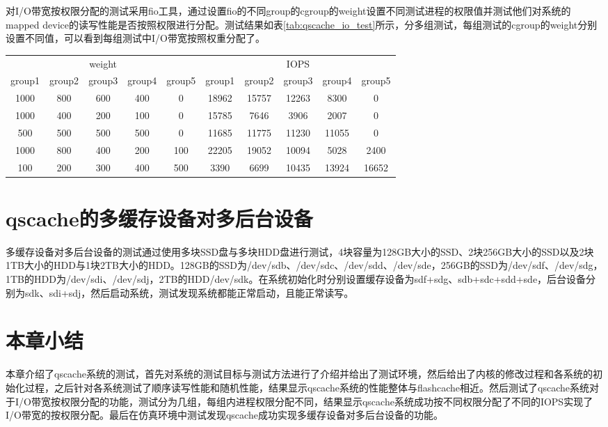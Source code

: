 对I/O带宽按权限分配的测试采用fio工具，通过设置fio的不同group的cgroup的weight设置不同测试进程的权限值并测试他们对系统的mapped device的读写性能是否按照权限进行分配。测试结果如表\ref{tab:qscache_io_test}所示，分多组测试，每组测试的cgroup的weight分别设置不同值，可以看到每组测试中I/O带宽按照权重分配了。

\begin{table}[!hpb]
    \centering
    \begin{tabular}{@{}cccccccccc@{}} 
        \toprule
        \multicolumn{5}{c}{weight} & \multicolumn{5}{c}{IOPS}\\
        group1 & group2 & group3 & group4 & group5 & group1 & group2 & group3 & group4 & group5 \\
        \midrule
        1000 & 800 & 600 & 400 & 0 & 18962 & 15757 & 12263 & 8300 & 0\\
        1000 & 400 & 200 & 100 & 0 & 15785 & 7646 & 3906 & 2007 & 0 \\ 
        500 & 500 & 500 & 500 & 0 & 11685 & 11775 & 11230 & 11055 & 0 \\ 
        1000 & 800 & 400 & 200 & 100 & 22205 & 19052 & 10094 & 5028 & 2400\\ 
        100 & 200 & 300 & 400 & 500 & 3390 & 6699 & 10435 & 13924 & 16652\\
        \bottomrule
    \end{tabular}
\end{table}

\section{qscache的多缓存设备对多后台设备}

多缓存设备对多后台设备的测试通过使用多块SSD盘与多块HDD盘进行测试，4块容量为128GB大小的SSD、2块256GB大小的SSD以及2块1TB大小的HDD与1块2TB大小的HDD。128GB的SSD为/dev/sdb、/dev/sdc、/dev/sdd、/dev/sde，256GB的SSD为/dev/sdf、/dev/sdg，1TB的HDD为/dev/sdi、/dev/sdj，2TB的HDD/dev/sdk。在系统初始化时分别设置缓存设备为sdf+sdg、sdb+sdc+sdd+sde，后台设备分别为sdk、sdi+sdj，然后启动系统，测试发现系统都能正常启动，且能正常读写。

\section{本章小结}

本章介绍了qscache系统的测试，首先对系统的测试目标与测试方法进行了介绍并给出了测试环境，然后给出了内核的修改过程和各系统的初始化过程，之后针对各系统测试了顺序读写性能和随机性能，结果显示qscache系统的性能整体与flashcache相近。然后测试了qscache系统对于I/O带宽按权限分配的功能，测试分为几组，每组内进程权限分配不同，结果显示qscache系统成功按不同权限分配了不同的IOPS实现了I/O带宽的按权限分配。最后在仿真环境中测试发现qscache成功实现多缓存设备对多后台设备的功能。